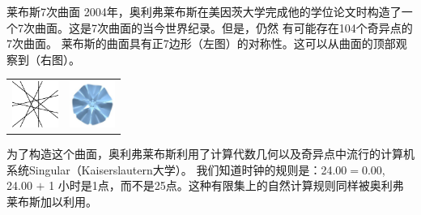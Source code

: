 ﻿\begin{surferPage}{莱布斯7次曲面}
2004年，奥利弗莱布斯在美因茨大学完成他的学位论文时构造了一个7次曲面。这是7次曲面的当今世界纪录。但是，仍然
有可能存在104个奇异点的7次曲面。  莱布斯的曲面具有正7边形（左图）的对称性。这可以从曲面的顶部观察到（右图）。 
    
    \vspace*{-0.3em}
    \begin{center}
      \begin{tabular}{c@{\qquad}c}
        \includegraphics[height=1.5cm]{./../../common/images/labsseptic1.pdf}
        &
        \includegraphics[height=1.5cm]{./../../common/images/labs_septic_von_oben}
      \end{tabular}
    \end{center}
    \vspace*{-0.3em}

为了构造这个曲面，奥利弗莱布斯利用了计算代数几何以及奇异点中流行的计算机系统{\sc Singular}（Kaiserslautern大学）。
我们知道时钟的规则是：24.00$=$0.00, 24.00 $+$ 1 小时是1点，而不是25点。这种有限集上的自然计算规则同样被奥利弗莱布斯加以利用。
\end{surferPage}


